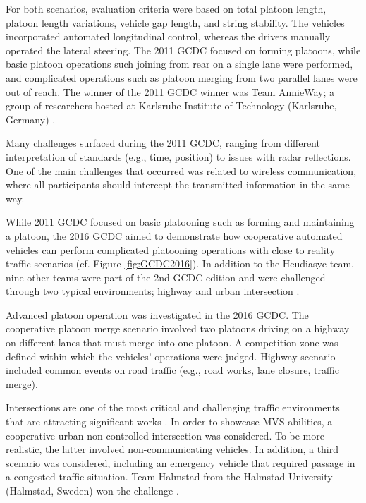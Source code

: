 For both scenarios, evaluation criteria were based on total platoon length, platoon length variations, vehicle gap length, and string stability. The vehicles incorporated automated longitudinal control, whereas the drivers manually operated the lateral steering. The 2011 GCDC focused on forming platoons, while basic platoon operations such joining from rear on a single lane were performed, and complicated operations such as platoon merging from two parallel lanes were out of reach. The winner of the 2011 GCDC winner was Team AnnieWay; a group of researchers hosted at Karlsruhe Institute of Technology (Karlsruhe, Germany) \cite{geiger2012team}. 

Many challenges surfaced during the 2011 GCDC, ranging from different interpretation of standards (e.g., time, position) to issues with radar reflections. One of the main challenges that occurred was related to wireless communication, where all participants should intercept the transmitted information in the same way. 

While 2011 GCDC focused on basic platooning such as forming and maintaining a platoon, the 2016 GCDC \cite{ploeg2017cooperative} aimed to demonstrate how cooperative automated vehicles can perform complicated platooning operations with close to reality traffic scenarios (cf. Figure \ref{fig:GCDC2016}). In addition to the Heudiasyc team, nine other teams were part of the 2nd GCDC edition and were challenged through two typical environments; highway and urban intersection \cite{englund2016grand}. 

Advanced platoon operation was investigated in the 2016 GCDC. The cooperative platoon merge scenario involved two platoons driving on a highway on different lanes that must merge into one platoon. A competition zone was defined within which the vehicles' operations were judged. Highway scenario included common events on road traffic (e.g., road works, lane closure, traffic merge). 

Intersections are one of the most critical and challenging traffic environments that are attracting significant works \cite{chen2015cooperative}. In order to showcase MVS abilities, a cooperative urban non-controlled intersection was considered. To be more realistic, the latter involved non-communicating vehicles. In addition, a third scenario was considered, including an emergency vehicle that required passage in a congested traffic situation. Team Halmstad from the Halmstad University (Halmstad, Sweden) won the challenge \cite{aramrattana2018team}. 



